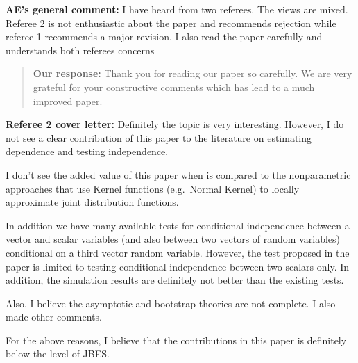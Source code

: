 \documentclass[
  12pt,
  letterpaper]{article}
\author{}
\date{\vspace{-2.5em}}
\numberwithin{equation}{section}
\begin{document}

\vspace{1cm}

\textbf{AE's general comment:} I have heard from two referees. The views are mixed. Referee 2 is not enthusiastic about the paper and recommends rejection while referee 1 recommends a major revision. I also read the paper carefully and understands both referees concerns

\begin{quote}
\textbf{Our response:} Thank you for reading our paper so carefully. We are very grateful for your constructive comments which has lead to a much improved paper.
\end{quote}

\textbf{Referee 2 cover letter:} Definitely the topic is very interesting. However, I do not see a clear contribution of this paper to the literature on estimating dependence and testing independence.

I don't see the added value of this paper when is compared to the nonparametric approaches that use Kernel functions (e.g.~Normal Kernel) to locally approximate joint distribution functions.

In addition we have many available tests for conditional independence between a vector and scalar variables (and also between two vectors of random variables) conditional on a third vector random variable. However, the test proposed in the paper is limited to testing conditional independence between two scalars only. In addition, the simulation results are definitely not better than the existing tests.

Also, I believe the asymptotic and bootstrap theories are not complete. I also made other comments.

For the above reasons, I believe that the contributions in this paper is definitely below the level of JBES.
\end{document}
